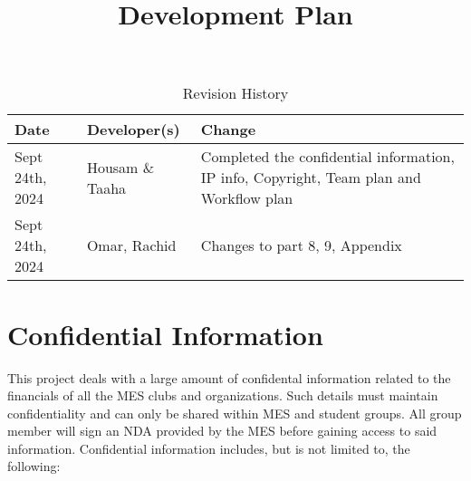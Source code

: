 \documentclass{article}
\title{Development Plan\\\progname}
\author{\authname}
\date{}
\begin{document}
\maketitle

\begin{table}[hp]
\caption{Revision History} \label{TblRevisionHistory}
\begin{tabularx}{\textwidth}{llX}
\toprule
\textbf{Date} & \textbf{Developer(s)} & \textbf{Change}\\
\midrule
Sept 24th, 2024 & Housam \& Taaha & Completed the confidential information, IP info, Copyright, Team plan and Workflow plan \\
Sept 24th, 2024 & Omar, Rachid & Changes to part 8, 9, Appendix\\
\bottomrule
\end{tabularx}
\end{table}

\newpage{}



\section{Confidential Information}
This project deals with a large amount of confidental information related to the financials of all the MES clubs and organizations. Such details must maintain confidentiality and can only be shared within MES and student groups. All group member will sign an NDA provided by the MES before gaining access to said information. Confidential information includes, but is not limited to, the following:
\end{document}
